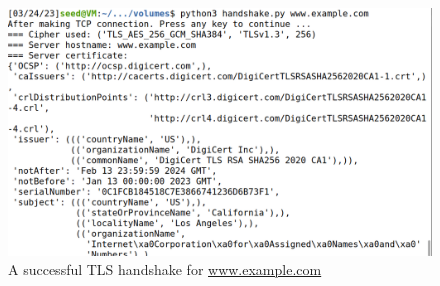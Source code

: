 \begin{figure}
    \centering
    \includegraphics[height=\textheight,width=\textwidth,keepaspectratio]
    {figures/handshake_example_succeed.png}
    \caption{A successful TLS handshake for \url{www.example.com}}
    \label{fig:handshake_example_succeed}
\end{figure}

